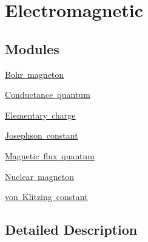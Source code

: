 \hypertarget{group___n_i_s_t_const-_electromagnetic}{}\section{Electromagnetic}
\label{group___n_i_s_t_const-_electromagnetic}
\subsection*{Modules}
\begin{DoxyCompactItemize}
\item 
\mbox{\hyperlink{group___n_i_s_t_const-_bohr_magneton}{Bohr magneton}}
\item 
\mbox{\hyperlink{group___n_i_s_t_const-_conductance_quantum}{Conductance quantum}}
\item 
\mbox{\hyperlink{group___n_i_s_t_const-_elementary_charge}{Elementary charge}}
\item 
\mbox{\hyperlink{group___n_i_s_t_const-_josephson_constant}{Josephson constant}}
\item 
\mbox{\hyperlink{group___n_i_s_t_const-_magnetic_flux_quantum}{Magnetic flux quantum}}
\item 
\mbox{\hyperlink{group___n_i_s_t_const-_nuclear_magneton}{Nuclear magneton}}
\item 
\mbox{\hyperlink{group___n_i_s_t_const-von_klitzing_constant}{von Klitzing constant}}
\end{DoxyCompactItemize}


\subsection{Detailed Description}
